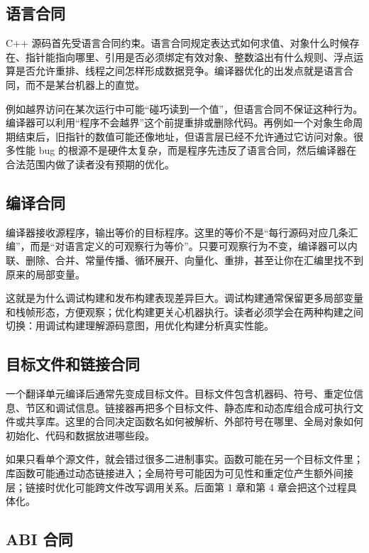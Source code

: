 \subsection{语言合同}

C++ 源码首先受语言合同约束。语言合同规定表达式如何求值、对象什么时候存在、指针能指向哪里、引用是否必须绑定有效对象、整数溢出有什么规则、浮点运算是否允许重排、线程之间怎样形成数据竞争。编译器优化的出发点就是语言合同，而不是某台机器上的直觉。

例如越界访问在某次运行中可能“碰巧读到一个值”，但语言合同不保证这种行为。编译器可以利用“程序不会越界”这个前提重排或删除代码。再例如一个对象生命周期结束后，旧指针的数值可能还像地址，但语言层已经不允许通过它访问对象。很多性能 bug 的根源不是硬件太复杂，而是程序先违反了语言合同，然后编译器在合法范围内做了读者没有预期的优化。

\subsection{编译合同}

编译器接收源程序，输出等价的目标程序。这里的等价不是“每行源码对应几条汇编”，而是“对语言定义的可观察行为等价”。只要可观察行为不变，编译器可以内联、删除、合并、常量传播、循环展开、向量化、重排，甚至让你在汇编里找不到原来的局部变量。

这就是为什么调试构建和发布构建表现差异巨大。调试构建通常保留更多局部变量和栈帧形态，方便观察；优化构建更关心机器执行。读者必须学会在两种构建之间切换：用调试构建理解源码意图，用优化构建分析真实性能。

\subsection{目标文件和链接合同}

一个翻译单元编译后通常先变成目标文件。目标文件包含机器码、符号、重定位信息、节区和调试信息。链接器再把多个目标文件、静态库和动态库组合成可执行文件或共享库。这里的合同决定函数名如何被解析、外部符号在哪里、全局对象如何初始化、代码和数据放进哪些段。

如果只看单个源文件，就会错过很多二进制事实。函数可能在另一个目标文件里；库函数可能通过动态链接进入；全局符号可能因为可见性和重定位产生额外间接层；链接时优化可能跨文件改写调用关系。后面第 1 章和第 4 章会把这个过程具体化。

\subsection{ABI 合同}

